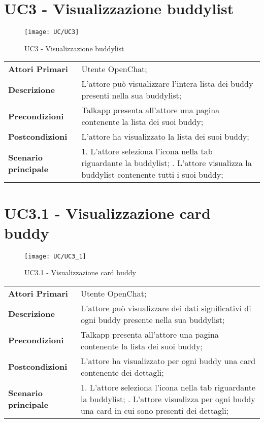 \section{UC3 - Visualizzazione buddylist}
\begin{figure}[H] 
	\centering
	\texttt{[image: UC/UC3]}
	\caption{UC3 - Visualizzazione buddylist}
\end{figure}
\begin{center}
	\bgroup
	\def\arraystretch{1.8}     
	\begin{longtable}{  p{4cm} | p{9.5cm} } 
		\textbf{Attori Primari} & Utente OpenChat; \\ 
		\textbf{Descrizione} &  L'attore può visualizzare l'intera lista dei buddy presenti nella sua buddylist; \\ 
		\textbf{Precondizioni}  & Talkapp presenta all'attore una pagina contenente la lista dei suoi buddy; \\
		\textbf{Postcondizioni} & L'attore ha visualizzato la lista dei suoi buddy;  \\ 
		\textbf{Scenario principale} & 
		1. L'attore seleziona l'icona nella tab riguardante la buddylist; \newline
		2. L'attore visualizza la buddylist contenente tutti i suoi buddy;
	\end{longtable}
	\egroup
\end{center}

\section{UC3.1 - Visualizzazione card buddy}
\begin{figure}[H] 
	\centering
	\texttt{[image: UC/UC3\_1]}
	\caption{UC3.1 - Visualizzazione card buddy}
\end{figure}
\begin{center}
	\bgroup
	\def\arraystretch{1.8}     
	\begin{longtable}{  p{4cm} | p{9.5cm} } 
		\textbf{Attori Primari} & Utente OpenChat; \\ 
		\textbf{Descrizione} &  L'attore può visualizzare dei dati significativi di ogni buddy presente nella sua buddylist; \\ 
		\textbf{Precondizioni}  & Talkapp presenta all'attore una pagina contenente la lista dei suoi buddy; \\
		\textbf{Postcondizioni} & L'attore ha visualizzato per ogni buddy una card contenente dei dettagli;  \\ 
		\textbf{Scenario principale} & 
		1. L'attore seleziona l'icona nella tab riguardante la buddylist; \newline
		2. L'attore visualizza per ogni buddy una card in cui sono presenti dei dettagli;
	\end{longtable}
	\egroup
\end{center}

